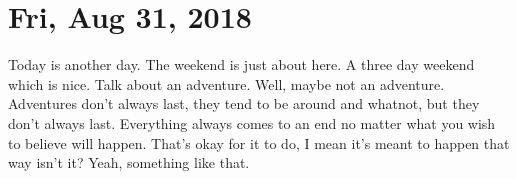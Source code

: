 \section{Fri, Aug 31, 2018}

Today is another day. The weekend is just about here. A three day weekend which is
nice. Talk about an adventure. Well, maybe not an adventure. Adventures don't always
last, they tend to be around and whatnot, but they don't always last. Everything
always comes to an end no matter what you wish to believe will happen. That's okay
for it to do, I mean it's meant to happen that way isn't it? Yeah, something like
that.